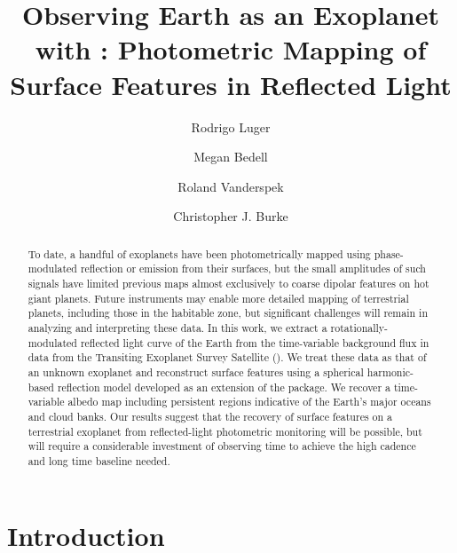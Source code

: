 \documentclass[modern]{aastex62}
\begin{document}

\title{Observing Earth as an Exoplanet with \TESS: Photometric Mapping of Surface Features in Reflected Light}

\author[0000-0002-0296-3826]{Rodrigo Luger}
%
\author[0000-0002-9328-5652]{Megan Bedell}
%
\author{Roland Vanderspek}
%
\author{Christopher J. Burke}

\begin{abstract}
To date, a handful of exoplanets have been photometrically mapped using phase-modulated 
reflection or emission from their surfaces, but the small amplitudes 
of such signals have limited previous maps almost exclusively to coarse dipolar
features on hot giant planets. 
Future instruments may enable more detailed mapping of terrestrial planets, including
those in the habitable zone,
but significant challenges will remain in analyzing and interpreting these data. 
In this work, we extract a rotationally-modulated reflected light curve of the Earth 
from the time-variable background flux in data from the Transiting Exoplanet Survey Satellite (\TESS).
We treat these data as that of an unknown exoplanet and reconstruct surface features  
using a spherical harmonic-based reflection model developed as an extension of 
the \starry package. We recover a time-variable albedo map including persistent 
regions indicative of the Earth's major oceans and cloud banks. 
Our results suggest that the recovery of surface features on a terrestrial exoplanet
from reflected-light photometric monitoring will be possible, but will require
a considerable investment of observing time to achieve the high cadence and 
long time baseline needed.
\href{https://github.com/rodluger/earthshine}{\color{linkcolor}\faGithub}
\end{abstract}


\section{Introduction}
\label{sec:intro}
\end{document}
